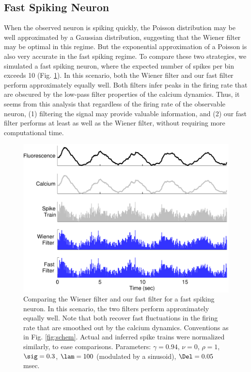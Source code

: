 \documentclass[12pt]{article}
\begin{document}
\subsection{Fast Spiking Neuron}

When the observed neuron is spiking quickly, the Poisson distribution may be well approximated by a Gaussian distribution, suggesting that the Wiener filter may be optimal in this regime.  But the exponential approximation of a Poisson is also very accurate in the fast spiking regime.  To compare these two strategies, we simulated a fast spiking neuron, where the expected number of spikes per bin exceeds 10 (Fig. \ref{fig:FastSpiking}). In this scenario, both the Wiener filter and our fast filter perform approximately equally well.  Both filters infer peaks in the firing rate that are obscured by the low-pass filter properties of the calcium dynamics. Thus, it seems from this analysis that regardless of the firing rate of the observable neuron, (1) filtering the signal may provide valuable information, and (2) our fast filter performs at least as well as the Wiener filter, without requiring more computational time.

\begin{figure}
\centering \includegraphics[width=.9\linewidth]{FastSpiking}
\caption{Comparing the Wiener filter and our fast filter for a fast spiking neuron.  In this scenario, the two filters perform approximately equally well. Note that both recover fast fluctuations in the firing rate that are smoothed out by the calcium dynamics. Conventions as in Fig. \ref{fig:schem}.  Actual and inferred spike trains were normalized similarly, to ease comparisons. Parameters: $\gamma=0.94$, $\nu=0$, $\rho=1$, $\sig=0.3$, $\lam=100$ (modulated by a sinusoid), $\Del=0.05$ msec.} \label{fig:FastSpiking}
\end{figure}
\end{document}
